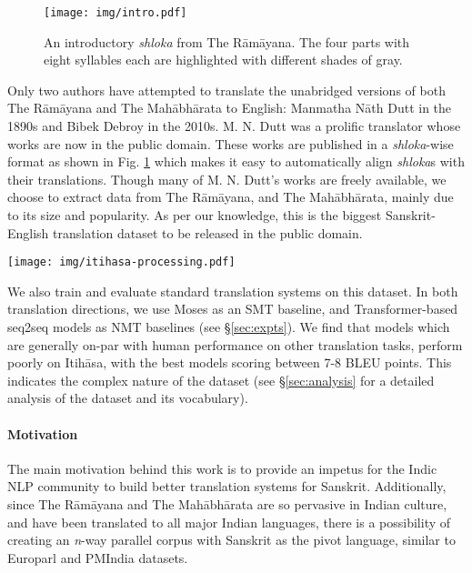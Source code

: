\documentclass[11pt,a4paper]{article}
\newcommand\itihasa{Itih\={a}sa\xspace}
\newcommand\ramayana{The R\={a}m\={a}yana\xspace}
\newcommand\mahabharata{The Mah\={a}bh\={a}rata\xspace}
\begin{document}
\begin{figure}
    \centering
    \texttt{[image: img/intro.pdf]}
    \caption{An introductory {\it shloka} from \ramayana. The four parts with eight syllables each are highlighted with different shades of gray.}
    \label{fig:intro}
\end{figure}

\noindent Only two authors have attempted to translate the unabridged versions of both \ramayana and \mahabharata to English: Manmatha N\={a}th Dutt in the 1890s and Bibek Debroy in the 2010s. M. N. Dutt was a prolific translator whose works are now in the public domain. These works are published in a {\it shloka}-wise format as shown in Fig. \ref{fig:intro} which makes it easy to automatically align {\it shloka}s with their translations. Though many of M. N. Dutt's works are freely available, we choose to extract data from \ramayana \cite{ramayana}, and \mahabharata \cite{mahabharata}, mainly due to its size and popularity. As per our knowledge, this is the biggest Sanskrit-English translation dataset to be released in the public domain.

\begin{figure*}
    \centering
    \texttt{[image: img/itihasa-processing.pdf]}
    \caption{Pre-processing Pipeline: The three steps shown here are: (i) invert the colour scheme of the PDF and dilate every detectable edge, (ii) find the indices of the longest vertical and horizontal lines in the page, and (iii) split the original PDF along the found separator lines.}
    \label{fig:preproc}
\end{figure*}

\noindent We also train and evaluate standard translation systems on this dataset. In both translation directions, we use Moses as an SMT baseline, and Transformer-based seq2seq models as NMT baselines (see \S\ref{sec:expts}). We find that models which are generally on-par with human performance on other translation tasks, perform poorly on \itihasa, with the best models scoring between 7-8 BLEU points. This indicates the complex nature of the dataset (see \S\ref{sec:analysis} for a detailed analysis of the dataset and its vocabulary).

\paragraph{Motivation}

The main motivation behind this work is to provide an impetus for the Indic NLP community to build better translation systems for Sanskrit. Additionally, since \ramayana and \mahabharata are so pervasive in Indian culture, and have been translated to all major Indian languages, there is a possibility of creating an {\it n}-way parallel corpus with Sanskrit as the pivot language, similar to Europarl \cite{europarl} and PMIndia \cite{pmindia} datasets.
\end{document}
